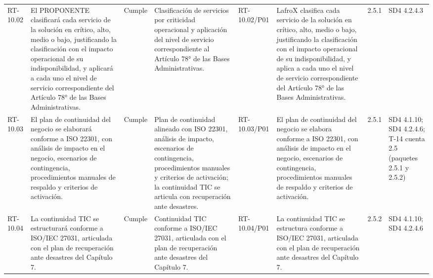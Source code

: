 \documentclass[oficio,firma,final]{lafrox}
\begin{document}
\begin{landscape}
{\begin{longtable}{@{}F{0.054} F{0.173} F{0.061} F{0.191} F{0.106} F{0.180} F{0.067} F{0.168}@{}}
  RT-10.02 & El PROPONENTE clasificará cada servicio de la solución en crítico, alto, medio o bajo, justificando la clasificación con el impacto operacional de su indisponibilidad, y aplicará a cada uno el nivel de servicio correspondiente del Artículo 78° de las Bases Administrativas. & Cumple & Clasificación de servicios por criticidad operacional y aplicación del nivel de servicio correspondiente al Artículo 78° de las Bases Administrativas. & RT-10.02/\allowbreak{}P01 & LafroX clasifica cada servicio de la solución en crítico, alto, medio o bajo, justificando la clasificación con el impacto operacional de su indisponibilidad, y aplica a cada uno el nivel de servicio correspondiente del Artículo 78° de las Bases Administrativas. & 2.5.1 & SD4 4.2.4.3  \\
  RT-10.03 & El plan de continuidad del negocio se elaborará conforme a ISO 22301, con análisis de impacto en el negocio, escenarios de contingencia, procedimientos manuales de respaldo y criterios de activación. & Cumple & Plan de continuidad alineado con ISO 22301, análisis de impacto, escenarios de contingencia, procedimientos manuales y criterios de activación; la continuidad TIC se articula con recuperación ante desastres. & RT-10.03/\allowbreak{}P01 & El plan de continuidad del negocio se elabora conforme a ISO 22301, con análisis de impacto en el negocio, escenarios de contingencia, procedimientos manuales de respaldo y criterios de activación. & 2.5.1 & SD4 4.1.10; SD4 4.2.4.6; T-14 cuenta 2.5 (paquetes 2.5.1 y 2.5.2)  \\
  RT-10.04 & La continuidad TIC se estructurará conforme a ISO/IEC 27031, articulada con el plan de recuperación ante desastres del Capítulo 7. & Cumple & Continuidad TIC conforme a ISO/IEC 27031, articulada con el plan de recuperación ante desastres del Capítulo 7. & RT-10.04/\allowbreak{}P01 & La continuidad TIC se estructura conforme a ISO/IEC 27031, articulada con el plan de recuperación ante desastres del Capítulo 7. & 2.5.2 & SD4 4.1.10; SD4 4.2.4.6  \\

\end{longtable}}
\end{landscape}
\end{document}
